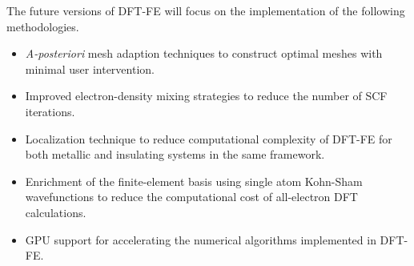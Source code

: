 The future versions of DFT-FE will focus on the implementation of the following methodologies.
\begin{itemize}
\item \emph{A-posteriori} mesh adaption techniques to construct optimal meshes with minimal user intervention.
\item Improved electron-density mixing strategies to reduce the number of SCF iterations.
\item Localization technique to reduce computational complexity of DFT-FE for both metallic and insulating systems in the same framework.
\item Enrichment of the finite-element basis using single atom Kohn-Sham wavefunctions to reduce the computational cost of all-electron DFT calculations.
\item GPU support for accelerating the numerical algorithms implemented in DFT-FE.	
\end{itemize} 
